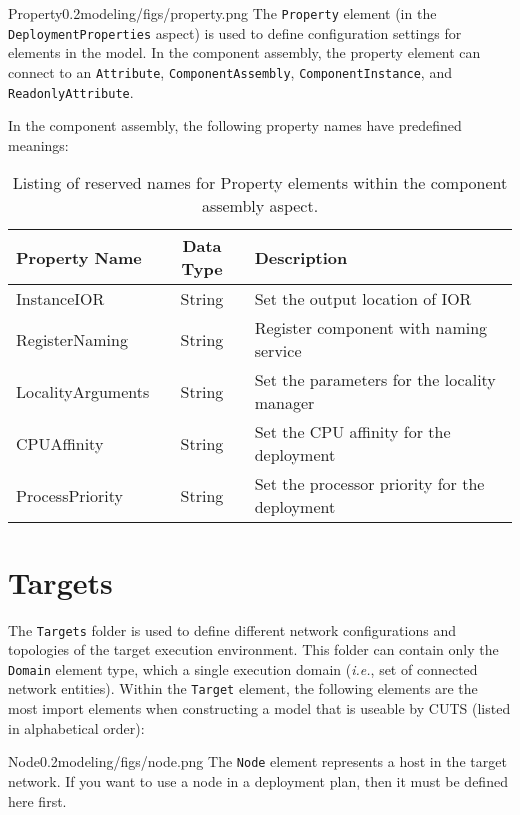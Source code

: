 \begin{modelelement}{Property}{0.2}{modeling/figs/property.png}
The \texttt{Property} element (in the \texttt{DeploymentProperties}
aspect) is used to define configuration
settings for elements in the model. In the component assembly, the
property element can connect to an \texttt{Attribute}, 
\texttt{ComponentAssembly}, \texttt{ComponentInstance}, and
\texttt{ReadonlyAttribute}.

In the component assembly, the following property names have
predefined meanings:
\begin{table}[h]
  \centering
  \begin{tabular}{lcl}
  \hline
  \textbf{Property Name} & \textbf{Data Type} & \textbf{Description}\\
  \hline
  InstanceIOR & String & Set the output location of IOR \\
  RegisterNaming & String & Register component with naming service  \\
  LocalityArguments & String & Set the parameters for the locality manager \\
  CPUAffinity & String & Set the CPU affinity for the deployment \\
  ProcessPriority & String & Set the processor priority for the deployment \\
  \end{tabular}

  \caption{Listing of reserved names for Property elements within
  the component assembly aspect.}
  \label{table:deployment-properties}
\end{table}

\end{modelelement}

\section{Targets}

The \texttt{Targets} folder is used to define different network
configurations and topologies of the target execution environment. 
This folder can contain only the \texttt{Domain} element
type, which a single execution domain (\textit{i.e.}, set of 
connected network entities). Within the \texttt{Target} element, the 
following elements are the most import elements when constructing 
a model that is useable by CUTS (listed in alphabetical order):

\begin{modelelement}{Node}{0.2}{modeling/figs/node.png}
The \texttt{Node} element represents a host in the target network. 
If you want to use a node in a deployment plan, then it must be 
defined here first.
\end{modelelement}

